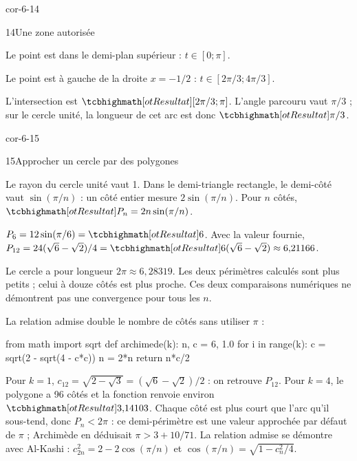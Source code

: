 \begin{blocLivre}{cor-6-14}
\begin{corrige}{14}{Une zone autorisée}
\begin{questions}
\item Le point est dans le demi-plan supérieur : $t\in[0;\pi]$.
\item Le point est à gauche de la droite $x=-1/2$ : $t\in[2\pi/3;4\pi/3]$.
\item L’intersection est $\res{[2\pi/3;\pi]}$. L’angle parcouru vaut $\pi/3$ ; sur le cercle unité, la longueur de cet arc est donc $\res{\pi/3}$.
\end{questions}

\label{figgeo-06-14-cor}
\end{corrige}
\end{blocLivre}
\begin{blocLivre}{cor-6-15}
\begin{corrige}{15}{Approcher un cercle par des polygones}
\begin{questions}
\item Le rayon du cercle unité vaut 1. Dans le demi-triangle rectangle, le demi-côté vaut
$\sin(\pi/n)$ : un côté entier mesure $2\sin(\pi/n)$. Pour $n$ côtés,
$\res{P_n=2n\sin(\pi/n)}$.
\item $P_6=12\sin(\pi/6)=\res{6}$.
Avec la valeur fournie, $P_{12}=24(\sqrt6-\sqrt2)/4=\res{6(\sqrt6-\sqrt2)}\approx6{,}21166$.
\item Le cercle a pour longueur $2\pi\approx6{,}28319$.
Les deux périmètres calculés sont plus petits ; celui à douze côtés est plus proche.
Ces deux comparaisons numériques ne démontrent pas une convergence pour tous les $n$.
\item La relation admise double le nombre de côtés sans utiliser $\pi$ :
\end{questions}
\begin{python}
from math import sqrt
def archimede(k):
    n, c = 6, 1.0
    for i in range(k):
        c = sqrt(2 - sqrt(4 - c*c))
        n = 2*n
    return n*c/2
\end{python}
Pour $k=1$, $c_{12}=\sqrt{2-\sqrt3}=(\sqrt6-\sqrt2)/2$ : on retrouve $P_{12}$.
Pour $k=4$, le polygone a 96 côtés et la fonction renvoie environ $\res{3{,}14103}$.
Chaque côté est plus court que l'arc qu'il sous-tend, donc $P_n<2\pi$ : ce demi-périmètre
est une valeur approchée par défaut de $\pi$ ;
Archimède en déduisait $\pi>3+10/71$. La relation admise se démontre avec Al-Kashi :
$c_{2n}^2=2-2\cos(\pi/n)$ et $\cos(\pi/n)=\sqrt{1-c_n^2/4}$.
\label{figgeo-06-15-cor}
\end{corrige}
\end{blocLivre}
